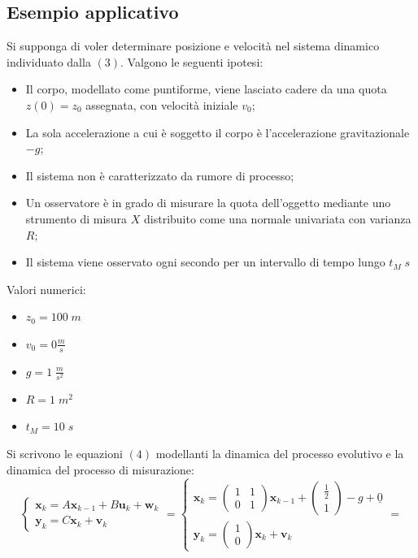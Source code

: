 \subsection{Esempio applicativo}
Si supponga di voler determinare posizione e velocit\`a nel sistema dinamico individuato dalla $(3)$. Valgono le seguenti ipotesi:
\begin{itemize}
	\item Il corpo, modellato come puntiforme, viene lasciato cadere da una quota $z(0) = z_0$ assegnata, con velocit\`a iniziale $v_0$;
	\item La sola accelerazione a cui \`e soggetto il corpo \`e l'accelerazione gravitazionale $-g$;
	\item Il sistema non \`e caratterizzato da rumore di processo;
	\item Un osservatore \`e in grado di misurare la quota dell'oggetto mediante uno strumento di misura $X$ 
	distribuito come una normale univariata con varianza $R$;
	\item Il sistema viene osservato ogni secondo per un intervallo di tempo lungo $t_{M}\;s$
\end{itemize}
Valori numerici:
\begin{itemize}
	\item $z_0 = 100\;m$
	\item $v_0 = 0 \frac{m}{s}$
	\item $g = 1\;\frac{m}{s^2}$
	\item $R = 1\;m^2$
	\item $t_M = 10\;s$
\end{itemize}
Si scrivono le equazioni $(4)$ modellanti la dinamica del processo evolutivo e la dinamica del processo di misurazione:
$$
\begin{cases}
\mathbf x_k = A \mathbf x_{k-1} + B \mathbf u_k + \mathbf w_k \\
\mathbf y_k = C \mathbf x_k + \mathbf v_k
\end{cases} = 
\begin{cases}
\mathbf x_k = \left(\begin{matrix}
1 & 1 \\
0 & 1 
\end{matrix}\right) \mathbf x_{k-1} + \left(\begin{matrix}
\frac{1}{2} \\
1
\end{matrix}\right) -g + \underline 0 \\
\mathbf y_k = \left(\begin{matrix}
1\\
0
\end{matrix}\right) \mathbf x_k + \mathbf v_k
\end{cases} = 
$$
